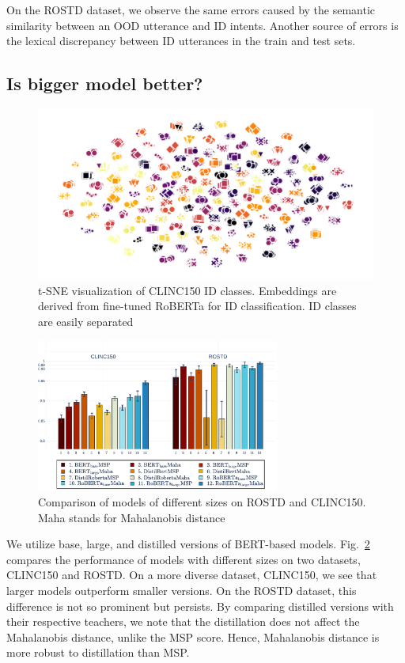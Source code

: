 \documentclass[letterpaper, final]{article} %
\begin{document}
On the ROSTD dataset, we observe the same errors caused by the semantic similarity between an OOD utterance and ID intents. Another source of errors is the lexical discrepancy between ID utterances in the train and test sets.



\subsection{Is bigger model better?}

\begin{figure}[t]
\includegraphics[width=\columnwidth]{roberta_train_features_tsne.png}
\caption{t-SNE visualization of CLINC150 ID classes. Embeddings are derived from fine-tuned RoBERTa for ID classification. ID classes are easily separated}
\label{fig:tsne}
\end{figure}

\begin{figure}[ht]%
\centering
\includegraphics[width=8cm]{images/aupr_clinc_rostd}
\caption{Comparison of models of different sizes on ROSTD and CLINC150. Maha stands for Mahalanobis distance}
\label{fig:model_size_aupr_ood}
\end{figure}


We utilize base, large, and distilled versions of BERT-based models. Fig.~\ref{fig:model_size_aupr_ood} compares the performance of models with different sizes on two datasets, CLINC150 and ROSTD. On a more diverse dataset, CLINC150, we see that larger models outperform smaller versions. On the ROSTD dataset, this difference is not so prominent but persists. By comparing distilled versions with their respective teachers, we note that the distillation does not affect the Mahalanobis distance, unlike the MSP score. Hence, Mahalanobis distance is more robust to distillation than MSP.
\end{document}
